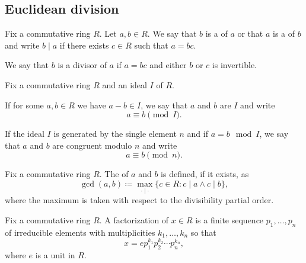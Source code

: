 \subsection{Euclidean division}\label{subsec:euclidean_division}

\begin{definition}\label{def:commutative_ring_division}
  Fix a commutative ring \( R \). Let \( a, b \in R \). We say that \( b \) is a  of \( a \) or that \( a \) is a  of \( b \) and write \( b \mid a \) if there exists \( c \in R \) such that \( a = bc \).

  We say that \( b \) is a  divisor of \( a \) if \( a = bc \) and either \( b \) or \( c \) is invertible.
\end{definition}

\begin{definition}\label{def:modulo}
  Fix a commutative ring \( R \) and an ideal \( I \) of \( R \).

  If for some \( a, b \in R \) we have \( a - b \in I \), we say that \( a \) and \( b \) are  \( I \) and write
  \begin{equation*}
    a \equiv b \pmod I.
  \end{equation*}

  If the ideal \( I \) is generated by the single element \( n \) and if \( a = b \mod I \), we say that \( a \) and \( b \) are congruent modulo \( n \) and write
  \begin{equation*}
    a \equiv b \pmod n.
  \end{equation*}
\end{definition}

\begin{definition}\label{def:greatest_common_denominator}
  Fix a commutative ring \( R \). The   of \( a \) and \( b \) is defined, if it exists, as
  \begin{equation*}
    \gcd(a, b) \coloneqq \max_{\cdot \mid \cdot} \{ c \in R : c \mid a \land c \mid b \},
  \end{equation*}
  where the maximum is taken with respect to the divisibility partial order.
\end{definition}

\begin{definition}\label{def:factorization_in_ring}
  Fix a commutative ring \( R \). A factorization of \( x \in R \) is a finite sequence \( p_1, \ldots, p_n \) of irreducible elements with multiplicities \( k_1, \ldots, k_n \) so that
  \begin{equation*}
    x = e p_1^{k_1} p_2^{k_2} \cdots p_n^{k_n},
  \end{equation*}
  where \( e \) is a unit in \( R \).
\end{definition}

